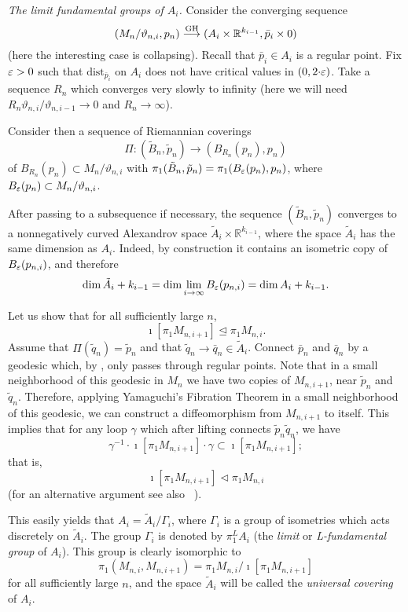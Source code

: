 \documentclass{amsart}
\begin{document}
{\it The limit fundamental groups of $A_i$.} 
Consider the converging sequence
\[(M_{n}/\vartheta_{n,i},p_{n})\GHto (A_i\times \mathbb{R}^{k_{i-1}},\bar p_i\times 0)\]
(here the interesting case is collapsing).
Recall that
$\bar p_i\in A_i$
is a regular point.
Fix $\varepsilon>0$ such that
$\text{dist}_{\bar p_i}$ on $A_i$
does not have critical values in $(0,2{\cdot} \varepsilon)$.
Take a sequence $R_n$ which converges very slowly to infinity
(here
we will need $R_n\vartheta_{n,i}/\vartheta_{n,i-1}\to 0$ and $R_n\to \infty$).

Consider then
a sequence of Riemannian coverings
$$\Pi\colon (\tilde B_n,\tilde p_n)\to (B_{R_n}(p_n), p_n)$$
of
$B_{R_n}(p_n)\subset {M}_n/\vartheta_{n,i}$ with
$\pi_1(\tilde B_n,\tilde p_n)=\pi_1(B_\varepsilon(p_{n}), p_n)$,
where $B_\varepsilon(p_{n})\subset M_n/\vartheta_{n,i}$.

After passing to a subsequence if necessary,
the sequence $(\tilde B_n,\tilde p_n)$
converges to a nonnegatively curved Alexandrov space
$\tilde A_i\times \mathbb{R}^{k_{i-1}}$,
where the space $\tilde A_i$ has the same dimension as $A_i$.
Indeed, by construction it  contains an isometric copy of
$B_\varepsilon(p_{n,i})$, and therefore
$$\dim \tilde A_i +k_{i-1}=
\dim \lim_{i\to\infty} B_\varepsilon(p_{n,i})=\dim A_i+k_{i-1}.$$

Let us show that for all sufficiently large $n$,
$$\imath[\pi_1M_{n,i+1}]\trianglelefteq\pi_1M_{n,i}.$$
Assume that $\Pi(\tilde q_n)=\tilde p_n$
and that $\tilde q_n\to \bar q_n\in \tilde A_i$.
Connect $\bar p_n$ and $\bar q_n$ by a geodesic
which, by \cite{Ptr3}, only passes  through regular points.
Note that in a small neighborhood  of this geodesic in $M_n$
 we have two copies of $M_{n,i+1}$, near $\tilde p_n$ and $\tilde q_n$.
Therefore,
applying Yamaguchi's  Fibration Theorem
in a small neighborhood  of this geodesic,
we can construct a diffeomorphism from $M_{n,i+1}$ to itself.
This  implies that for any loop $\gamma$ which after lifting
connects $\tilde p_n \tilde q_n$,
we have 
$$\gamma^{-1}{\cdot} \imath[\pi_1M_{n,i+1}]{\cdot}
\gamma\subset \imath[\pi_1M_{n,i+1}];$$  
that is,
$$\imath[\pi_1M_{n,i+1}]\lhd\pi_1M_{n,i}$$
(for an alternative argument see also ~\cite{FY}).


This easily yields that $A_i=\tilde A_i/\Gamma_i$,
where $\Gamma_i$ is a group of isometries
which acts %
discretely on $\tilde A_i$.
The group $\Gamma_i$ is denoted  by $\pi_1^LA_i$
(the \emph{limit} or \emph{L-fundamental group} of $A_i$).
This group  is clearly isomorphic to
$$\pi_1(M_{n,i},M_{n,i+1})=\pi_1M_{n,i}/\imath[ \pi_1M_{n,i+1}]$$
for all sufficiently large $n$, and
the space $\tilde A_i$ will be called the \emph{universal covering} of $A_i$.
\end{document}
